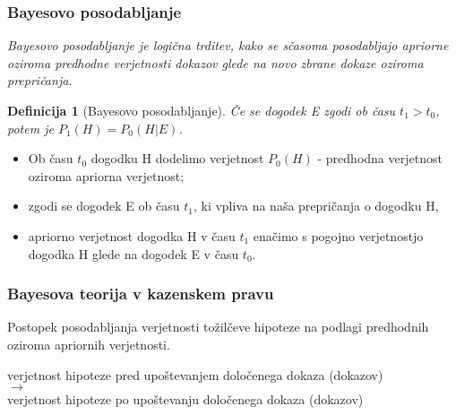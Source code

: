 \documentclass{beamer}
\newtheorem{definicija}{Definicija}
\begin{document}
\begin{frame}
   \frametitle{Bayesovo posodabljanje}
   \textit{
      Bayesovo posodabljanje je logična trditev, kako se sčasoma posodabljajo apriorne oziroma predhodne verjetnosti dokazov glede na novo zbrane dokaze 
      oziroma prepričanja.
      \vspace{5mm}
   }
   \begin{definicija}[Bayesovo posodabljanje]
      Če se dogodek E zgodi ob času $t_1 > t_0$, potem je $P_1(H) = P_0(H \lvert E)$. \vspace{3mm}
  \end{definicija}
  \begin{itemize}
   \item Ob času $t_0$ dogodku H dodelimo verjetnost $P_0(H)$ - predhodna verjetnost oziroma apriorna verjetnost;
   \item zgodi se dogodek E ob času $t_1$, ki vpliva na naša prepričanja o dogodku H,
   \item apriorno verjetnost dogodka H v času $t_1$ enačimo s pogojno verjetnostjo dogodka H glede na dogodek E v času $t_0$.
  \end{itemize}
\end{frame}

\begin{frame}
   \frametitle{Bayesova teorija v kazenskem pravu}
   Postopek posodabljanja verjetnosti tožilčeve hipoteze na podlagi predhodnih oziroma apriornih verjetnosti. \\ \vspace{3mm}
   \begin{block}{}
       \centering
       verjetnost hipoteze pred upoštevanjem določenega dokaza (dokazov) \\ \vspace{2mm}
       $\rightarrow$ \\ \vspace{3mm}
       verjetnost hipoteze po upoštevanju določenega dokaza (dokazov)
   \end{block}
\end{frame}
\end{document}
